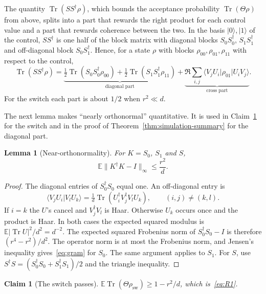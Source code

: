 \documentclass[11pt,letterpaper]{article}
\newtheorem{lemma}[theorem]{Lemma}
\newtheorem{claim}[theorem]{Claim}
\theoremstyle{definition}\newtheorem{definition}[theorem]{Definition}
\newcommand{\E}{\mathbb E}
\newcommand{\Tr}{\operatorname{Tr}}
\newcommand{\ket}[1]{\lvert#1\rangle}
\newcommand{\bra}[1]{\langle#1\rvert}
\newcommand{\norm}[1]{\lVert#1\rVert}
\begin{document}
The quantity $\Tr(SS^\dagger\rho)$, which bounds the acceptance
probability $\Tr(\Theta\rho)$ from above, splits into a part that
rewards the right product for each control value and a part that
rewards coherence between the two. In the basis $\ket0,\ket1$ of the control,
$SS^\dagger$ is one half of the block matrix with diagonal blocks
$S_0S_0^\dagger$, $S_1S_1^\dagger$ and off-diagonal block
$S_0S_1^\dagger$. Hence, for a state $\rho$ with blocks
$\rho_{00},\rho_{01},\rho_{11}$ with respect to the control,
\begin{equation}\label{eq:block-form}
 \Tr(SS^\dagger\rho)=\underbrace{\tfrac12\Tr(S_0S_0^\dagger\rho_{00})
 +\tfrac12\Tr(S_1S_1^\dagger\rho_{11})}_{\text{diagonal part}}
 +\underbrace{\Re\sum_{i,j}\bra{V_jU_i}\rho_{01}\ket{U_iV_j}}_{\text{cross part}} .
\end{equation}
For the switch each part is about $1/2$ when $r^2\ll d$.

The next lemma makes ``nearly orthonormal'' quantitative. It is used
in Claim~\ref{clm:switch-passes} for the switch and in the proof of
Theorem~\ref{thm:simulation-summary} for the diagonal part.

\begin{lemma}[Near-orthonormality]\label{lem:gram}
For $K=S_0$, $S_1$ and $S$,
\begin{equation}\label{eq:gram}
 \E\norm{K^\dagger K-I}_\infty\le\frac{r^2}d.
\end{equation}
\end{lemma}

\begin{proof}
The diagonal entries of $S_0^\dagger S_0$ equal one. An off-diagonal
entry is
\[
 \langle V_jU_i|V_lU_k\rangle=\tfrac1d\Tr(U_i^\dagger V_j^\dagger V_lU_k),
 \qquad(i,j)\ne(k,l).
\] If $i=k$ the $U$'s cancel and $V_j^\dagger V_l$
is Haar. Otherwise $U_k$ occurs once and the product is Haar. In both
cases the expected squared modulus is $\E|\Tr U|^2/d^2=d^{-2}$. The
expected squared Frobenius norm of $S_0^\dagger S_0-I$ is therefore
$(r^4-r^2)/d^2$. The operator norm is at most the Frobenius norm, and
Jensen's inequality gives~\eqref{eq:gram} for $S_0$. The same argument
applies to $S_1$. For $S$, use
$S^\dagger S=(S_0^\dagger S_0+S_1^\dagger S_1)/2$ and the triangle
inequality.
\end{proof}

\begin{claim}[The switch passes]\label{clm:switch-passes}
$\E\Tr(\Theta\rho_{\mathrm{sw}})\ge1-r^2/d$, which is~\eqref{eq:R1}.
\end{claim}
\end{document}
